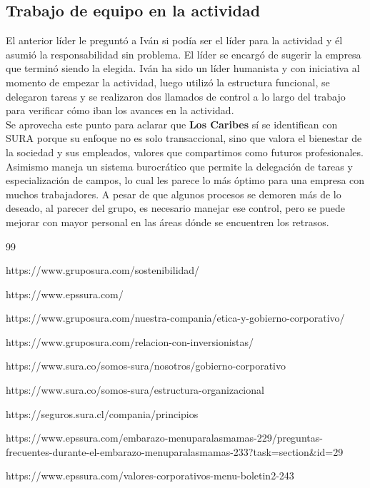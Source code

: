 \documentclass[onecolumn]{article} %
\begin{document}
	
	\subsection{Trabajo de equipo en la actividad}
	
	El anterior líder le preguntó a Iván si podía ser el líder para la actividad y él asumió la responsabilidad sin problema. El líder se encargó de sugerir la empresa que terminó siendo la elegida. Iván ha sido un líder humanista y con iniciativa al momento de empezar la actividad, luego utilizó la estructura funcional, se delegaron tareas y se realizaron dos llamados de control a lo largo del trabajo para verificar cómo iban los avances en la actividad.\\
	
	Se aprovecha este punto para aclarar que \textbf{Los Caribes} sí se identifican con SURA porque su enfoque no es solo transaccional, sino que valora el bienestar de la sociedad y sus empleados, valores que compartimos como futuros profesionales. Asimismo maneja un sistema burocrático que permite la delegación de tareas y especialización de campos, lo cual les parece lo más óptimo para una empresa con muchos trabajadores. A pesar de que algunos procesos se demoren más de lo deseado, al parecer del grupo, es necesario manejar ese control, pero se puede mejorar con mayor personal en las áreas dónde se encuentren los retrasos. 
	
	
	\newpage
	
	\begin{thebibliography}{99}
		
		 https://www.gruposura.com/sostenibilidad/
		
		 https://www.epssura.com/
		
		 https://www.gruposura.com/nuestra-compania/etica-y-gobierno-corporativo/
		
		 https://www.gruposura.com/relacion-con-inversionistas/
		
		 https://www.sura.co/somos-sura/nosotros/gobierno-corporativo
		
		 https://www.sura.co/somos-sura/estructura-organizacional
		
		 https://seguros.sura.cl/compania/principios
		
		 https://www.epssura.com/embarazo-menuparalasmamas-229/preguntas-frecuentes-durante-el-embarazo-menuparalasmamas-233?task=section\&id=29
		
		 https://www.epssura.com/valores-corporativos-menu-boletin2-243
		
	\end{thebibliography}
	
	
\end{document}
